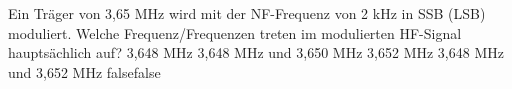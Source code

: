     {Ein Träger von 3,65 MHz wird mit der NF-Frequenz von 2 kHz in SSB (LSB) moduliert. Welche Frequenz/Frequenzen treten im modulierten HF-Signal hauptsächlich auf?}
    {3,648 MHz}
    {3,648 MHz und 3,650 MHz}
    {3,652 MHz}
    {3,648 MHz und 3,652 MHz}
    {false}{false}